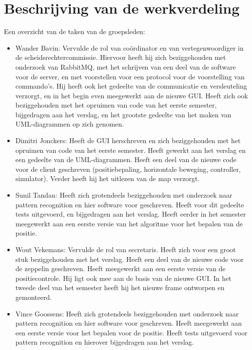 \documentclass[eind]{penoverslag}
\begin{document}
\section{Beschrijving van de werkverdeling}
Een overzicht van de taken van de groepsleden: \\
\begin{itemize}
\item Wander Bavin: Vervulde de rol van co\"ordinator en van vertegenwoordiger in de scheidsrechtercommissie. Hiervoor heeft hij zich beziggehouden met onderzoek van RabbitMQ, met het schrijven van een deel van de software voor de server, en met voorstellen voor een protocol voor de voorstelling van commando's. Hij heeft ook het gedeelte van de communicatie en versleuteling verzorgt, en in het begin even meegewerkt aan de nieuwe GUI. Heeft zich ook beziggehouden met het opruimen van code van het eerste semester, bijgedragen aan het verslag, en het grootste gedeelte van het maken van UML-diagrammen op zich genomen.
\item Dimitri Jonckers: Heeft de GUI herschreven en zich beziggehouden met het opruimen van code van het eerste semester. Heeft gewerkt aan het verslag en een gedeelte van de UML-diagrammen. Heeft een deel van de nieuwe code voor de client geschreven (positiebepaling, horizontale beweging, controller, simulator). Verder heeft hij het uitlezen van de map verzorgt.
\item Sunil Tandan: Heeft zich grotendeels beziggehouden met onderzoek naar pattern recognition en hier software voor geschreven. Heeft voor dit gedeelte tests uitgevoerd, en bijgedragen aan het verslag. Heeft eerder in het semester meegewerkt aan een eerste versie van het algoritme voor het bepalen van de positie.
\item Wout Vekemans: Vervulde de rol van secretaris. Heeft zich voor een groot stuk beziggehouden met het verslag. Heeft een deel van de nieuwe code voor de zeppelin geschreven. Heeft meegewerkt aan een eerste versie van de positiecontrole. Hij ligt ook mee aan de basis van de nieuwe GUI. In het tweede deel van het semester heeft hij het nieuwe frame ontworpen en gemonteerd.
\item Vince Goossens: Heeft zich grotendeels beziggehouden met onderzoek naar pattern recognition en hier software voor geschreven. Heeft meegewerkt aan een eerste versie voor het bepalen voor de positie. Heeft tests uitgevoerd voor pattern recognition en hierover bijgedragen aan het verslag.
\end{itemize}
\end{document}
